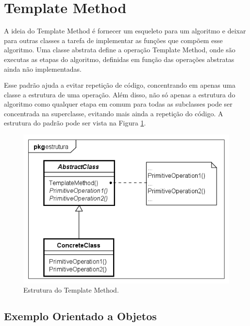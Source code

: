 \section{Template Method}

A ideia do Template Method é fornecer um esqueleto para um algoritmo 
e deixar para outras classes a tarefa de implementar as funções que 
compõem esse algoritmo. Uma classe abstrata define a operação Template 
Method, onde são executas as etapas do algoritmo, definidas em função 
das operações abstratas ainda não implementadas.\cite{gamma:1995}

Esse padrão ajuda a evitar repetição de código, concentrando 
em apenas uma classe a estrutura de uma operação. Além disso, 
não só apenas a estrutura do algoritmo como qualquer etapa em 
comum para todas as subclasses pode ser concentrada na superclasse, 
evitando mais ainda a repetição do código. A estrutura do padrão 
pode ser vista na Figura \ref{tpmethod_struct}.

\begin{figure}[htb]
	\caption{\label{tpmethod_struct}Estrutura do Template Method.}
	\begin{center}
	    \includegraphics[scale=0.5]{5_padroes-contexto-funcional/5.3_comportamentais/5.3.10_template-method/templatemethod_estrutura.png}
	\end{center}
\end{figure}

\subsection*{Exemplo Orientado a Objetos}

